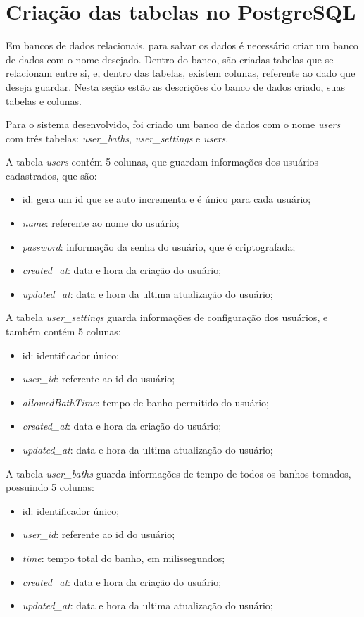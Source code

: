 \section{Criação das tabelas no PostgreSQL}

Em bancos de dados relacionais, para salvar os dados é necessário criar um banco de dados com o nome desejado. Dentro do banco, são criadas tabelas que se relacionam entre si, e, dentro das tabelas, existem colunas, referente ao dado que deseja guardar. Nesta seção estão as descrições do banco de dados criado, suas tabelas e colunas.

Para o sistema desenvolvido, foi criado um banco de dados com o nome \textit{users} com três tabelas: \textit{user\_baths}, \textit{user\_settings} e \textit{users}.

A tabela \textit{users} contém 5 colunas, que guardam informações dos usuários cadastrados, que são:
\begin{itemize}
	\item id: gera um id que se auto incrementa e é único para cada usuário;
	\item \textit{name}: referente ao nome do usuário;
	\item \textit{password}: informação da senha do usuário, que é criptografada;
	\item \textit{created\_at}: data e hora da criação do usuário;
	\item \textit{updated\_at}: data e hora da ultima atualização do usuário;
\end{itemize}

A tabela \textit{user\_settings} guarda informações de configuração dos usuários, e também contém 5 colunas:

\begin{itemize}
	\item id: identificador único;
	\item \textit{user\_id}: referente ao id do usuário;
	\item \textit{allowedBathTime}: tempo de banho permitido do usuário;
	\item \textit{created\_at}: data e hora da criação do usuário;
	\item \textit{updated\_at}: data e hora da ultima atualização do usuário;
\end{itemize}

A tabela \textit{user\_baths} guarda informações de tempo de todos os banhos tomados, possuindo 5 colunas:

\begin{itemize}
	\item id: identificador único;
	\item \textit{user\_id}: referente ao id do usuário;
	\item \textit{time}: tempo total do banho, em milissegundos;
	\item \textit{created\_at}: data e hora da criação do usuário;
	\item \textit{updated\_at}: data e hora da ultima atualização do usuário;
\end{itemize}

